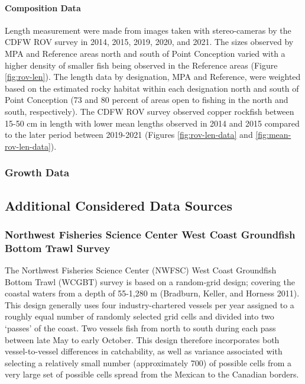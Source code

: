 \documentclass[11pt,
  english,
  letterpaper,
]{article}
\begin{document}
\hypertarget{composition-data-4}{%
\paragraph{\texorpdfstring{Composition Data\\
}{Composition Data }}\label{composition-data-4}}

Length measurement were made from images taken with stereo-cameras by the CDFW ROV survey in 2014, 2015, 2019, 2020, and 2021. The sizes observed by MPA and Reference areas north and south of Point Conception varied with a higher density of smaller fish being observed in the Reference areas (Figure \ref{fig:rov-len}). The length data by designation, MPA and Reference, were weighted based on the estimated rocky habitat within each designation north and south of Point Conception (73 and 80 percent of areas open to fishing in the north and south, respectively). The CDFW ROV survey observed copper rockfish between 15-50 cm in length with lower mean lengths observed in 2014 and 2015 compared to the later period between 2019-2021 (Figures \ref{fig:rov-len-data} and \ref{fig:mean-rov-len-data}).

\hypertarget{growth-data}{%
\subsubsection{Growth Data}\label{growth-data}}

\hypertarget{additional-considered-data-sources}{%
\subsection{Additional Considered Data Sources}\label{additional-considered-data-sources}}

\hypertarget{northwest-fisheries-science-center-west-coast-groundfish-bottom-trawl-survey}{%
\subsubsection{Northwest Fisheries Science Center West Coast Groundfish Bottom Trawl Survey}\label{northwest-fisheries-science-center-west-coast-groundfish-bottom-trawl-survey}}

The Northwest Fisheries Science Center (NWFSC) West Coast Groundfish Bottom Trawl (WCGBT) survey is based on a random-grid design; covering the coastal waters from a depth of 55-1,280 m (Bradburn, Keller, and Horness 2011). This design generally uses four industry-chartered vessels per year assigned to a roughly equal number of randomly selected grid cells and divided into two `passes' of the coast. Two vessels fish from north to south during each pass between late May to early October. This design therefore incorporates both vessel-to-vessel differences in catchability, as well as variance associated with selecting a relatively small number (approximately 700) of possible cells from a very large set of possible cells spread from the Mexican to the Canadian borders.
\end{document}
